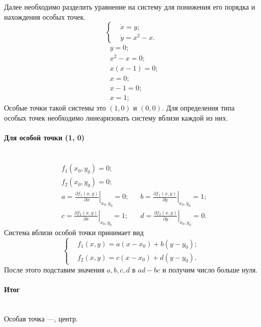 \documentclass[14pt]{extarticle}
\begin{document}
Далее необходимо разделить уравнение на систему для понижения его порядка и нахождения особых точек.
\begin{equation}
  \left\lbrace
  \begin{aligned}
    &\dot{x} = y;\\
    &\dot{y} = x^2-x.
  \end{aligned}
  \right.
\end{equation}
\begin{equation}
  \begin{aligned}
    &y=0;\\
    &x^2-x=0;\\
    &x(x-1)=0;\\
    &x=0;\\
    &x-1=0;\\
    &x=1;
  \end{aligned}
\end{equation}
Особые точки такой системы это $(1, 0)$ и $(0, 0)$. Для определения типа особых точек необходимо линеаризовать систему вблизи каждой из них.

\paragraph{Для особой точки (1, 0)}$\quad$\\
\begin{equation}
  \begin{aligned}
    &f_1(x_0,y_0)=0;\\
    &f_2(x_0,y_0)=0;\\
    &a = \left.\frac{\partial f_1(x,y)}{\partial x}\right|_{x_0,y_0} = 0; && b = \left.\frac{\partial f_1(x,y)}{\partial y}\right|_{x_0,y_0} = 1;\\
    &c = \left.\frac{\partial f_2(x,y)}{\partial x}\right|_{x_0,y_0} =1; && d = \left.\frac{\partial f_2(x,y)}{\partial y}\right|_{x_0,y_0} = 0.
  \end{aligned}
\end{equation}
Система вблизи особой точки принимает вид
\begin{equation}
  \left\lbrace
  \begin{aligned}
    &f_1(x,y) = a(x-x_0)+b(y-y_0);\\
    &f_2(x,y) = c(x-x_0)+d(y-y_0).
  \end{aligned}
  \right.
\end{equation}
После этого подставим значения $a, b, c, d$ в $ad-bc$ и получим число больше нуля.
\paragraph{Итог}$\quad$\\
Особая точка ---, центр.
\end{document}
